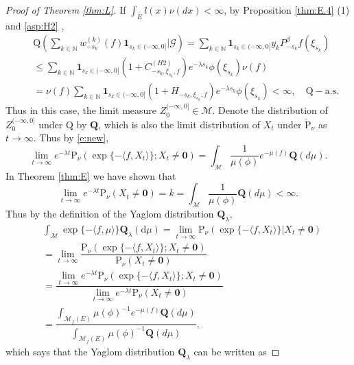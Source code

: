 \documentclass[12pt,a4paper]{amsart}
\numberwithin{equation}{section}
\theoremstyle{plain}
\theoremstyle{definition}
\theoremstyle{remark}
\begin{document}
\begin{proof}[Proof of Theorem \ref{thm:L}]
If  $\int_E l(x) \nu(dx)<\infty$,
 by Proposition \ref{thm:E.4} (1) and \eqref{asp:H2} ,
\begin{eqnarray*}
&&\mathrm Q\left( \sum_{k\in\mathbb N}w^{(k)}_{-s_k}(f)\mathbf 1_{s_k\in (-\infty, 0]}\Big|\mathcal G\right)=\sum_{k\in\mathbb N}\mathbf 1_{s_k\in (-\infty, 0]}y_kP^{\beta}_{-s_k}f( \xi_{s_k})\\
&&\leq\sum_{k\in\mathbb N}\mathbf 1_{s_k\in (-\infty, 0]}(1+C^{(H2)}_{-s_k, \xi_{s_k}, f})
e^{-\lambda s_k}\phi(\xi_{s_k})\nu(f)\\
&&=\nu(f)\sum_{k\in\mathbb N}\mathbf 1_{s_k\in (-\infty, 0]}(1+H_{-s_k, \xi_{s_k}, f})
e^{-\lambda s_k}\phi(\xi_{s_k})<\infty, \quad \mathrm Q-\text{a.s.}
\end{eqnarray*}
 Thus in this case, the limit measure
$Z_0^{(-\infty, 0]}\in \mathcal M$.
 Denote the distribution of $Z_0^{(-\infty, 0]}$ under
  ${\mathrm Q}$ by $\mathbf Q$,
  which is also the limit distribution of $X_t$ under $\widetilde{\mathrm P}_\nu$ as $t\to\infty$.  
 Thus by \eqref{e:new},
\[
\lim_{t\rightarrow\infty}e^{-\lambda t}\mathrm P_\nu\left(\exp\{-\langle f, X_t\rangle \};
X_t\neq \mathbf 0\right)=
\int_{{\mathcal M}}\frac{1}{\mu(\phi)}e^{-\mu(f)}\mathbf Q(d\mu).
\]
In Theorem \ref{thm:E} we have shown that
\[
\lim_{t\rightarrow\infty}e^{-\lambda t}\mathrm P_\nu(X_t\neq \mathbf 0)=k
=\int_{{\mathcal M}}\frac{1}{\mu(\phi)}\mathbf Q(d\mu)<\infty.
\]
Thus by the definition of the Yaglom distribution ${\mathbf Q}_\lambda $,
\begin{align*}
&\int_{\mathcal M}\exp\{-\langle f, \mu\rangle \}\mathbf Q_\lambda(\mathrm d\mu)
=\lim_{t\rightarrow\infty}\mathrm P_\nu\left(\exp\{-\langle f, X_t\rangle \}\Big|X_t\neq \mathbf 0\right)\\
&=\lim_{t\rightarrow\infty}\dfrac{\mathrm P_\nu\left(\exp\{-\langle f, X_t\rangle \};X_t\neq \mathbf 0\right)}{\mathrm P_\nu(X_t\neq \mathbf 0)}\\
&=\dfrac{\lim_{t\rightarrow\infty}e^{-\lambda t}\mathrm P_\nu\left(\exp\{-\langle f, X_t\rangle \};X_t\neq \mathbf 0\right)}{\lim_{t\rightarrow\infty}e^{-\lambda t}\mathrm P_\nu(X_t\neq \mathbf 0)}\\
&=\dfrac{\int_{{\mathcal M}_f(E)}\mu(\phi)^{-1}e^{-\mu(f)}\mathbf Q(d\mu)}{\int_{{\mathcal M}_f(E)}\mu(\phi)^{-1}\mathbf Q(d\mu)},
\end{align*}
which says that the Yaglom distribution ${\mathbf Q}_\lambda$ can be written as

\end{proof}
\end{document}
